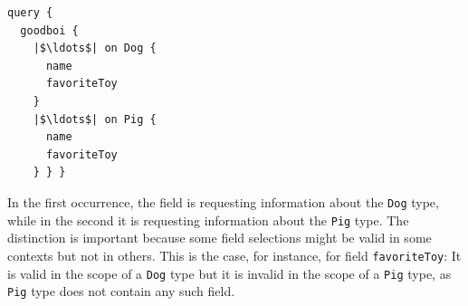 \begin{verbatim}
query {
  goodboi {
    |$\ldots$| on Dog {
      name
      favoriteToy
    }
    |$\ldots$| on Pig {
      name
      favoriteToy
    } } }
\end{verbatim}



\noindent In the first occurrence, the field is requesting information about the
\texttt{Dog} type, while in the second it is requesting information about the \texttt{Pig} type. The distinction is important because some field selections might be valid in some contexts but not in others. This is the case, for instance, for field \texttt{favoriteToy}: It is valid in the scope of a \texttt{Dog} type but it is invalid in the scope of a \texttt{Pig} type, as \texttt{Pig} type does not contain any such field. %



